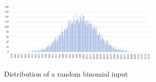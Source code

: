 \begin{figure}[h]
      \caption{Distribution of a random binomial input}
      \centering
      \includegraphics[width=0.7\textwidth]{figures/images/numberGenerator/binomialDistributionForN10000p0_1.png}\label{fig:binDistExample}
\end{figure}